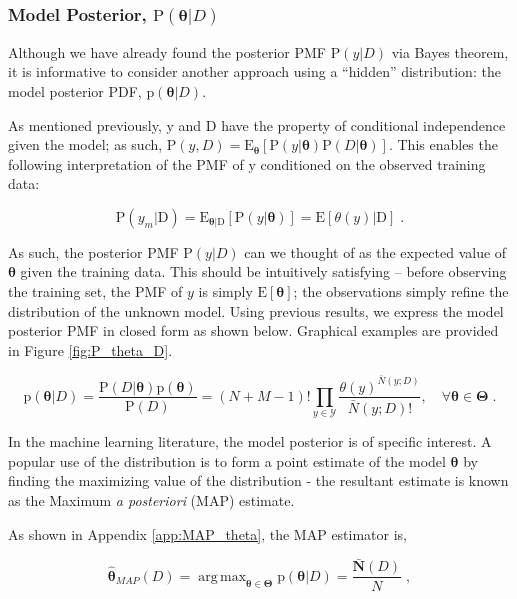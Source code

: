 \documentclass[12pt]{report}
\DeclareMathOperator*{\argmax}{arg\,max}
\begin{document}
\subsubsection{Model Posterior, $\text{P}(\bm{\theta} | D)$}

Although we have already found the posterior PMF $\text{P}(y | D)$ via Bayes theorem, it is informative to consider another approach using a ``hidden'' distribution: the model posterior PDF, $\text{p}(\bm{\theta} | D)$. 

As mentioned previously, $\mathrm{y}$ and $\mathrm{D}$ have the property of conditional independence given the model; as such, $\text{P}(y,D) = \text{E}_{\bm{\theta}} \left[ \text{P}(y | \bm{\theta}) \text{P}(D | \bm{\theta}) \right]$. This enables the following interpretation of the PMF of $\mathrm{y}$ conditioned on the observed training data:

\begin{equation}
\text{P}(y_m | \mathrm{D}) = \text{E}_{\bm{\theta} | \mathrm{D}} \left[ \text{P}(y|\bm{\theta}) \right] = \text{E}\left[ \theta(y) | \mathrm{D} \right] \;.
\end{equation}

As such, the posterior PMF $\text{P}(y | D)$ can we thought of as the expected value of $\bm{\theta}$ given the training data. This should be intuitively satisfying -- before observing the training set, the PMF of $y$ is simply $\text{E}[\bm{\theta}]$; the observations simply refine the distribution of the unknown model. Using previous results, we express the model posterior PMF in closed form as shown below. Graphical examples are provided in Figure \ref{fig:P_theta_D}.

\begin{equation} \label{P_t_D}
\text{p}(\bm{\theta} | D) = \frac{\text{P}(D | \bm{\theta}) \text{p}(\bm{\theta})}{\text{P}(D)}
= (N+M-1)! \prod_{y \in \mathcal{Y}} \frac{\theta(y)^{\bar{N}(y;D)}}{\bar{N}(y;D)!} ,  \quad  \forall \bm{\theta} \in \bm{\Theta} \;.
\end{equation}


In the machine learning literature, the model posterior is of specific interest. A popular use of the distribution is to form a point estimate of the model $\bm{\theta}$ by finding the maximizing value of the distribution - the resultant estimate is known as the Maximum \emph{a posteriori} (MAP) estimate. 

As shown in Appendix \ref{app:MAP_theta}, the MAP estimator is,

\begin{equation}
\hat{\bm{\theta}}_{MAP}(D) = \argmax_{\bm{\theta} \in \bm{\Theta}} \text{p}(\bm{\theta} | D) = \frac{\bar{\bm{N}}(D)}{N} \;,
\end{equation}
\end{document}
